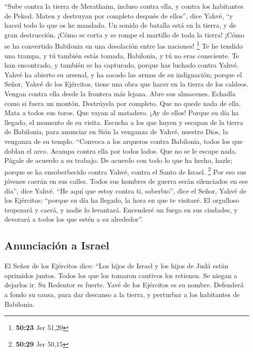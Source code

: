 \begin{paracol}{2}
 ``Sube contra la tierra de Merathaim, incluso contra
ella, y contra los habitantes de Pekod. Maten y destruyan por completo
después de ellos'', dice Yahvé, ``y haced todo lo que os he mandado.
 Un sonido de batalla está en la tierra, y de gran
destrucción.  ¡Cómo se corta y se rompe el martillo de
toda la tierra! ¡Cómo se ha convertido Babilonia en una desolación entre
las naciones! \footnote{\textbf{50:23} Jer 51,20}  Te he
tendido una trampa, y tú también estás tomada, Babilonia, y tú no eras
consciente. Te han encontrado, y también se ha capturado, porque has
luchado contra Yahvé.  Yahvé ha abierto su arsenal, y ha
sacado las armas de su indignación; porque el Señor, Yahvé de los
Ejércitos, tiene una obra que hacer en la tierra de los caldeos.
 Vengan contra ella desde la frontera más lejana. Abre
sus almacenes. Echadla como si fuera un montón. Destrúyela por completo.
Que no quede nada de ella.  Mata a todos sus toros. Que
vayan al matadero. ¡Ay de ellos! Porque su día ha llegado, el momento de
su visita.  Escucha a los que huyen y escapan de la
tierra de Babilonia, para anunciar en Sión la venganza de Yahvé, nuestro
Dios, la venganza de su templo.  ``Convoca a los arqueros
contra Babilonia, todos los que doblan el arco. Acampa contra ella por
todos lados. Que no se le escape nada. Págale de acuerdo a su trabajo.
De acuerdo con todo lo que ha hecho, hazle; porque se ha ensoberbecido
contra Yahvé, contra el Santo de Israel. \footnote{\textbf{50:29} Jer
  50,15}  Por eso sus jóvenes caerán en sus calles. Todos
sus hombres de guerra serán silenciados en ese día'', dice Yahvé.
 ``He aquí que estoy contra ti, soberbio'', dice el
Señor, Yahvé de los Ejércitos; ``porque su día ha llegado, la hora en
que te visitaré.  El orgulloso tropezará y caerá, y nadie
lo levantará. Encenderé un fuego en sus ciudades, y devorará a todos los
que estén a su alrededor''.

\hypertarget{anunciaciuxf3n-a-israel}{%
\subsection{Anunciación a Israel}\label{anunciaciuxf3n-a-israel}}

 El Señor de los Ejércitos dice: ``Los hijos de Israel y
los hijos de Judá están oprimidos juntos. Todos los que los tomaron
cautivos los retienen. Se niegan a dejarlos ir.  Su
Redentor es fuerte. Yavé de los Ejércitos es su nombre. Defenderá a
fondo su causa, para dar descanso a la tierra, y perturbar a los
habitantes de Babilonia.


\end{paracol}
